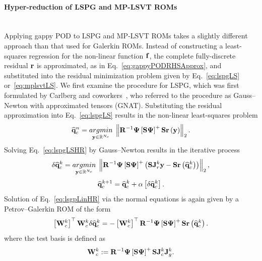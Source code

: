 \paragraph*{Hyper-reduction of LSPG and MP-LSVT ROMs}\mbox{}\\
%
Applying gappy POD to LSPG and MP-LSVT ROMs takes a slightly different approach than that used for Galerkin ROMs. Instead of constructing a least-squares regression for the non-linear function $\mathbf{f}$, the complete fully-discrete residual $\mathbf{r}$ is approximated, as in Eq.~\ref{eq:gappyPODRHSApprox}, and substituted into the residual minimization problem given by Eq.~\ref{eq:lspgLS} or~\ref{eq:mplsvtLS}. We first examine the procedure for LSPG, which was first formulated by Carlberg and coworkers~\cite{Carlberg2010,Carlberg2013}, who referred to the procedure as Gauss--Newton with approximated tensors (GNAT). Substituting the residual approximation into Eq.~\ref{eq:lspgLS} results in the non-linear least-squares problem
%
\begin{equation}\label{eq:lspgLSHR}
    \consVecCoef^{\timeIdx} = \argmin{\dummyVec \inROne{\numConsModes}} \left\Vert \resScaleInv \deimBasis \left[ \sampMat \deimBasis \right]^{+} \sampMat \resFunc{\dummyVec} \right\Vert_2.
\end{equation}
%
Solving Eq.~\ref{eq:lspgLSHR} by Gauss--Newton results in the iterative process
%
\begin{equation}\label{eq:lsgpLinHR}
    \delta \consVecCoef^{\newtonIdx} = \argmin{\dummyVec \inROne{\numConsModes}} \left\Vert \resScaleInv \deimBasis \left[ \sampMat \deimBasis \right]^{+} \left(\sampMat \jacobRes^{\newtonIdx} \dummyVec - \sampMat \resFunc{\consVecCoef^{\newtonIdx}}\right) \right\Vert_2,
\end{equation}
\begin{equation}
    \mathbf{\widehat{q}}_{c}^{k + 1} = \mathbf{\widehat{q}}_{c}^{k} + \alpha \left[ \delta \mathbf{\widehat{q}}_{c}^{k} \right].
\end{equation}
%
Solution of Eq.~\ref{eq:lsgpLinHR} via the normal equations is again given by a Petrov--Galerkin ROM of the form
%
\begin{equation}\label{eq:lspgHRSolve}
    \left[ \testBasisCons^\newtonIdx \right]^\top \testBasisCons^\newtonIdx \delta \consVecCoef^{\newtonIdx} = -\left[\testBasisCons^\newtonIdx \right]^\top \resScaleInv \deimBasis \left[ \sampMat \deimBasis \right]^{+} \sampMat \resFunc{\consVecCoef^{\newtonIdx}}.
\end{equation}
%
where the test basis is defined as
%
\begin{equation}\label{eq:lspgHRTest}
    \testBasisCons^\newtonIdx \defEq \resScaleInv \deimBasis \left[ \sampMat \deimBasis \right]^{+} \sampMat \jacobCons^{\newtonIdx} \jacobDecode^{\newtonIdx}.
\end{equation}
%

